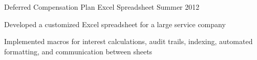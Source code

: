 \begin{cventries}
  \bproject
    {Deferred Compensation Plan Excel Spreadsheet} %
    {Summer 2012} %
    {
      \begin{cvitems} %
        \item {Developed a customized Excel spreadsheet for a large service company}
        \item {Implemented macros for interest calculations, audit trails, indexing, automated formatting, and communication between sheets}
      \end{cvitems}
    }



\end{cventries}
